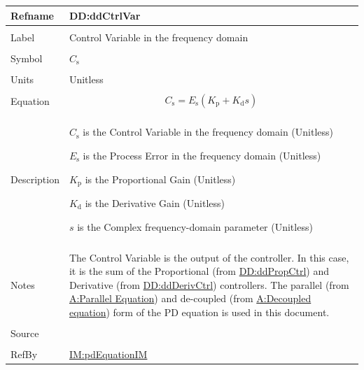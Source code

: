 \documentclass[12pt]{article}
\begin{document}
\vspace{\baselineskip}
\noindent
\begin{minipage}{\textwidth}
\begin{tabular}{>{\raggedright}p{}>{\raggedright\arraybackslash}p{}}
\toprule \textbf{Refname} & \textbf{DD:ddCtrlVar}
\label{DD:ddCtrlVar}
\\ \midrule \\
Label & Control Variable in the frequency domain
        
\\ \midrule \\
Symbol & ${C_{\text{s}}}$
         
\\ \midrule \\
Units & Unitless
        
\\ \midrule \\
Equation & \begin{displaymath}
           {C_{\text{s}}}={E_{\text{s}}} \left({K_{\text{p}}}+{K_{\text{d}}} s\right)
           \end{displaymath}
\\ \midrule \\
Description & \begin{symbDescription}
              \item{${C_{\text{s}}}$ is the Control Variable in the frequency domain (Unitless)}
              \item{${E_{\text{s}}}$ is the Process Error in the frequency domain (Unitless)}
              \item{${K_{\text{p}}}$ is the Proportional Gain (Unitless)}
              \item{${K_{\text{d}}}$ is the Derivative Gain (Unitless)}
              \item{$s$ is the Complex frequency-domain parameter (Unitless)}
              \end{symbDescription}
\\ \midrule \\
Notes & The Control Variable is the output of the controller. In this case, it is the sum of the Proportional (from \hyperref[DD:ddPropCtrl]{DD:ddPropCtrl}) and Derivative (from \hyperref[DD:ddDerivCtrl]{DD:ddDerivCtrl}) controllers. The parallel (from \hyperref[parallelEq]{A:Parallel Equation}) and de-coupled (from \hyperref[decoupled]{A:Decoupled equation}) form of the PD equation is used in this document.
        
\\ \midrule \\
Source & \cite{johnson2008}
         
\\ \midrule \\
RefBy & \hyperref[IM:pdEquationIM]{IM:pdEquationIM}
        
\\ \bottomrule
\end{tabular}
\end{minipage}
\end{document}
